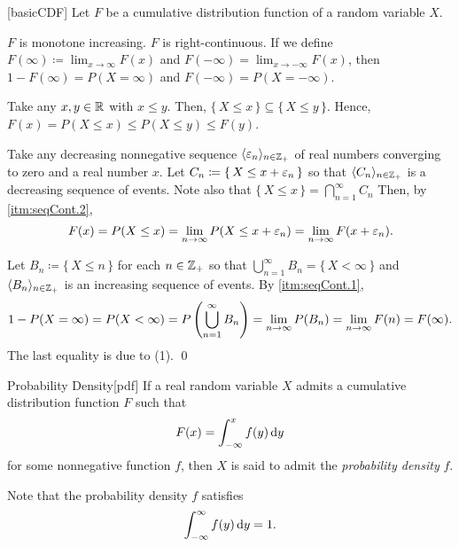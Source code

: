 \documentclass[../complex_variables_1.tex]{subfiles}
\begin{document}
\begin{Lemma}{}[basicCDF]
    Let \(F\) be a cumulative distribution function of a random variable \(X\).
    \begin{enumerate}[label=(\arabic*), ref=\protect{\Cref{lem:basicCDF} (\arabic*)}]
        \ii
        \(F\) is monotone increasing.
        \ii
        \(F\) is right-continuous.
        \ii
        If we define \(F(\infty) \coloneqq \lim_{x\to\infty}F(x)\) and \(F(-\infty) = \lim_{x \to
        -\infty} F(x)\), then \(1 - F(\infty) = P(X = \infty)\) and \(F(-\infty) = P(X =
        -\infty)\).
    \end{enumerate}
\end{Lemma}
\begin{myclaim}[Proof]\hfill
\begin{enumerate}[label=(\arabic*)]
    \ii
    Take any \(x, y \in \RR\) with \(x \le y\).
    Then, \(\{\,X \le x\,\} \subseteq \{\,X \le y\,\}\).
    Hence, \(F(x) = P(X \le x) \le P(X \le y) \le F(y)\).

    \ii
    Take any decreasing nonnegative sequence \(\lang \veps_n \rang_{n \in \ZZ_+}\)
    of real numbers converging to zero and a real number \(x\).
    Let \(C_n \coloneqq \{\,X \le x + \varepsilon_n \,\}\)
    so that \(\lang C_n \rang_{n \in \ZZ_+}\) is a decreasing sequence of events.
    Note also that \(\{\,X \le x\,\} = \bigcap_{n=1}^\infty C_n\)
    Then, by \ref{itm:seqCont.2},
    \[
        F(x) = P(X \le x) = \lim_{n \to \infty} P(X \le x + \varepsilon_n) = \lim_{n \to \infty} F(x +
        \varepsilon_n)\text.
    \]

    \ii
    Let \(B_n \coloneqq \{\,X \le n\,\}\) for each \(n \in \ZZ_+\)
    so that \(\bigcup_{n=1}^\infty B_n = \{\,X < \infty\,\}\)
    and \(\lang B_n \rang_{n \in \ZZ_+}\) is an increasing sequence of events.
    By \ref{itm:seqCont.1},
    \[
        1 - P(X = \infty) = P(X < \infty)
        = P \left( \bigcup_{n=1}^\infty B_n \right)
        = \lim_{n\to\infty} P(B_n) = \lim_{n\to\infty} F(n) = F(\infty)\text.
    \]
    The last equality is due to (1).
    \qed
\end{enumerate}
\end{myclaim}

\begin{Definition}{Probability Density}[pdf]
    If a real random variable \(X\) admits a cumulative distribution function \(F\) such that
    \[
        F(x) = \int_{-\infty}^x f(y) \,\mathrm{d} y
    \]
    for some nonnegative function \(f\), then \(X\) is said to admit the
    \emph{probability density} \(f\).
\end{Definition}

\begin{note}
    Note that the probability density \(f\) satisfies
    \[
        \int_{-\infty}^\infty f(y) \,\mathrm{d} y = 1\text.
    \]
\end{note}
\end{document}
